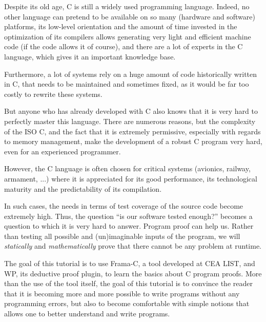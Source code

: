 \newpage

Despite its old age, C is still a widely used programming language.
Indeed, no other language can pretend to be available on so many
(hardware and software) platforms, its low-level orientation
and the amount of time invested in the optimization of its compilers
allows generating very light and efficient machine code (if the code
allows it of course), and there are a lot of experts in the C language,
which gives it an important knowledge base.


Furthermore, a lot of systems rely on a huge amount of code historically
written in C, that needs to be maintained and sometimes fixed, as it
would be far too costly to rewrite these systems.


But anyone who has already developed with C also knows that it is very
hard to perfectly master this language. There are numerous reasons, but
the complexity of the ISO C, and the fact that it is extremely permissive,
especially with regards to memory management, make the development of
a robust C program very hard, even for an experienced programmer.



However, the C language is often chosen for critical systems (avionics,
railway, armament, ...) where it is appreciated for its good
performance, its technological maturity and the predictability of its
compilation.



In such cases, the needs in terms of test coverage of the source code
become extremely high. Thus, the question ``is our software tested
enough?'' becomes a question to which it is very hard to answer. Program
proof can help us.
Rather than testing all possible and (un)imaginable inputs of the program,
we will \emph{statically} and \emph{mathematically} prove that there
cannot be any problem at runtime.



The goal of this tutorial is to use Frama-C, a tool developed at CEA
LIST, and WP, its deductive proof plugin, to learn the basics about C
program proofs. More than the use of the tool itself, the goal of this
tutorial is to convince the reader that it is becoming more and more possible to write
programs without any programming errors, but also to become
comfortable with simple
notions that allows one to better understand and write programs.



